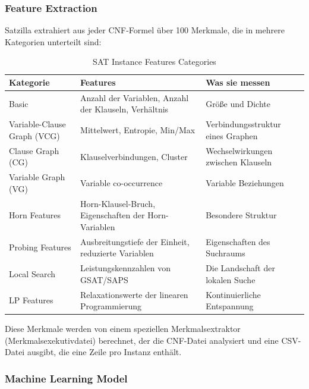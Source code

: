 \newpage

\subsubsection{Feature Extraction}

Satzilla extrahiert aus jeder CNF-Formel über 100 Merkmale, die in mehrere Kategorien unterteilt sind:

\begin{table}[htbp]
    \centering
    \small
    \begin{tabular}{lp{}p{}}
        \textbf{Kategorie} & \textbf{Features} & \textbf{Was sie messen} \\
        \toprule
        Basic & Anzahl der Variablen, Anzahl der Klauseln, Verhältnis & Größe und Dichte \\
        \midrule
        Variable-Clause Graph (VCG) & Mittelwert, Entropie, Min/Max & Verbindungsstruktur eines Graphen \\
        \midrule
        Clause Graph (CG) & Klauselverbindungen, Cluster & Wechselwirkungen zwischen Klauseln \\
        \midrule
        Variable Graph (VG) & Variable co-occurrence & Variable Beziehungen \\
        \midrule
        Horn Features & Horn-Klausel-Bruch, Eigenschaften der Horn-Variablen & Besondere Struktur \\
        \midrule
        Probing Features & Ausbreitungstiefe der Einheit, reduzierte Variablen & Eigenschaften des Suchraums \\
        \midrule
        Local Search & Leistungskennzahlen von GSAT/SAPS & Die Landschaft der lokalen Suche \\
        \midrule
        LP Features & Relaxationswerte der linearen Programmierung & Kontinuierliche Entspannung \\
        \bottomrule
    \end{tabular}
    \caption{SAT Instance Features Categories}\label{tab:sat_features}
\end{table}

Diese Merkmale werden von einem speziellen Merkmalsextraktor (Merkmalsexekutivdatei) berechnet, der die 
CNF-Datei analysiert und eine CSV-Datei ausgibt, die eine Zeile pro Instanz enthält.

\subsubsection{Machine Learning Model}

